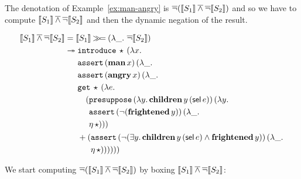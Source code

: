 The denotation of Example~\ref{ex:man-angry} is
$\mathop{\overline{\lnot}} (\llbracket S_1 \rrbracket \mathbin{\overline{\land}} \mathop{\overline{\lnot}} \llbracket S_2 \rrbracket)$ and so we have to compute
$\llbracket S_1 \rrbracket \mathbin{\overline{\land}} \mathop{\overline{\lnot}} \llbracket S_2 \rrbracket$ and then the dynamic negation of the
result.

\begin{align*}
  \llbracket S_1 \rrbracket \mathbin{\overline{\land}} \mathop{\overline{\lnot}} \llbracket S_2 \rrbracket
  &= \llbracket S_1 \rrbracket \mathbin{\gg\!=} (\lambda \_.\, \mathop{\overline{\lnot}} \llbracket S_2 \rrbracket) \\
  &\twoheadrightarrow \begin{aligned}[t]
      &\mathtt{introduce}\,\star\,(\lambda x.\,  \\
      &\mathtt{assert}\,(\textbf{man}\,x)\,(\lambda \_.\,  \\
      &\mathtt{assert}\,(\textbf{angry}\,x)\,(\lambda \_.\,  \\
      &\mathtt{get}\,\star\,(\lambda e.\,  \\
      &\quad \begin{aligned}[t]
          (&\mathtt{presuppose}\,(\lambda y.\, \textbf{children}\,y\,(\textsf{sel}\,e))\,(\lambda y.\,  \\
           &\mathtt{assert}\,(\lnot (\textbf{frightened}\,y))\,(\lambda \_.\,  \\
           &\eta\,\star)))
         \end{aligned} \\
      &+ \begin{aligned}[t]
          (&\mathtt{assert}\,(\lnot (\exists y.\, \textbf{children}\,y\,(\textsf{sel}\,e) \land \textbf{frightened}\,y))\,(\lambda \_.\,  \\
           &\eta\,\star))))))
         \end{aligned}
    \end{aligned}
\end{align*}

We start computing $\mathop{\overline{\lnot}} (\llbracket S_1 \rrbracket \mathbin{\overline{\land}} \mathop{\overline{\lnot}} \llbracket S_2 \rrbracket)$ by boxing
$\llbracket S_1 \rrbracket \mathbin{\overline{\land}} \mathop{\overline{\lnot}} \llbracket S_2 \rrbracket$:

